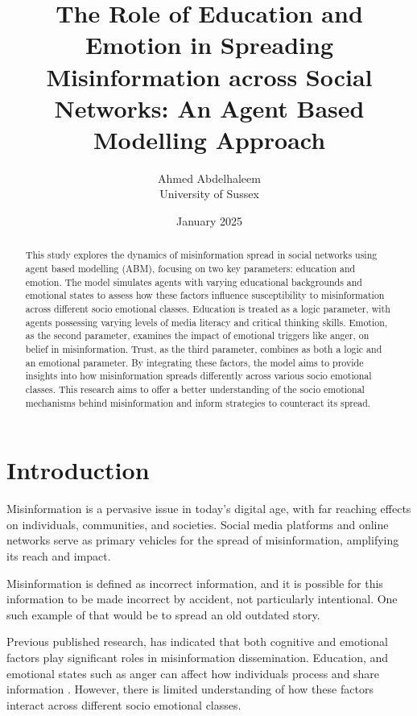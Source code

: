 \documentclass[twocolumn, a4paper, 12pt]{article}
\title{The Role of Education and Emotion in Spreading Misinformation across Social Networks: An Agent Based Modelling Approach}
\author{Ahmed Abdelhaleem \\ University of Sussex}
\date{January 2025}
\begin{document}
\maketitle


\begin{abstract}
  This study explores the dynamics of misinformation spread in social networks using agent based modelling (ABM), focusing on two key parameters: education and emotion. The model simulates agents with varying educational backgrounds and emotional states to assess how these factors influence susceptibility to misinformation across different socio emotional classes. Education is treated as a logic parameter, with agents possessing varying levels of media literacy and critical thinking skills. Emotion, as the second parameter, examines the impact of emotional triggers like anger, on belief in misinformation. Trust, as the third parameter, combines as both a logic and an emotional parameter. By integrating these factors, the model aims to provide insights into how misinformation spreads differently across various socio emotional classes. This research aims to offer a better understanding of the socio emotional mechanisms behind misinformation and inform strategies to counteract its spread.
\end{abstract}

\tableofcontents   %
\listoffigures     %


\section{Introduction}
Misinformation is a pervasive issue in today's digital age, with far reaching effects on individuals, communities, and societies. Social media platforms and online networks serve as primary vehicles for the spread of misinformation, amplifying its reach and impact.

Misinformation is defined as incorrect information, and it is possible for this information to be made incorrect by accident, not particularly intentional. One such example of that would be to spread an old outdated story.\cite{definition}

Previous published research, has indicated that both cognitive and emotional factors play significant roles in misinformation dissemination. Education, and emotional states such as anger can affect how individuals process and share information \cite{education} \cite{emotion}. However, there is limited understanding of how these factors interact across different socio emotional classes.
\end{document}
